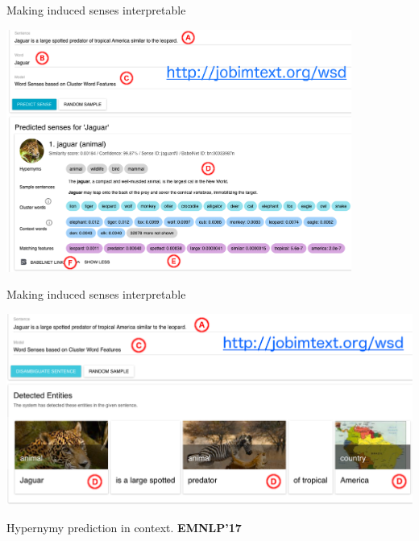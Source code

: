 \documentclass[usenames,dvipsnames]{beamer}
\begin{document}
\begin{frame}{ Making induced senses interpretable }

\vspace{-1em}
	\begin{center}
	\includegraphics[width=0.85\textwidth]{emnlp_single}
	\end{center}	
\end{frame}


\begin{frame}{ Making induced senses interpretable }

\vspace{-1em}
	\begin{center}
	\includegraphics[width=1.05\textwidth]{emnlp_all}
	
	{\footnotesize Hypernymy prediction in context. \textbf{EMNLP'17}~\cite{panchenko-EtAl:2017:EMNLP2017Demos}}
	\end{center}	
	
	

	
\end{frame}
\end{document}
